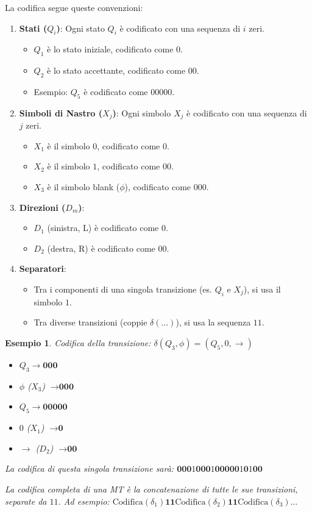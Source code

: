 \documentclass[a4paper, 11pt]{book} %
\newtheorem{example}[theorem]{Esempio}
\theoremstyle{definition}
\begin{document}
La codifica segue queste convenzioni:
\begin{enumerate}
    \item \textbf{Stati ($Q_i$)}: Ogni stato $Q_i$ è codificato con una sequenza di $i$ zeri.
    \begin{itemize}
        \item $Q_1$ è lo stato iniziale, codificato come $0$.
        \item $Q_2$ è lo stato accettante, codificato come $00$.
        \item Esempio: $Q_5$ è codificato come $00000$.
    \end{itemize}
    \item \textbf{Simboli di Nastro ($X_j$)}: Ogni simbolo $X_j$ è codificato con una sequenza di $j$ zeri.
    \begin{itemize}
        \item $X_1$ è il simbolo $0$, codificato come $0$.
        \item $X_2$ è il simbolo $1$, codificato come $00$.
        \item $X_3$ è il simbolo blank ($\phi$), codificato come $000$.
    \end{itemize}
    \item \textbf{Direzioni ($D_m$)}:
    \begin{itemize}
        \item $D_1$ (sinistra, L) è codificato come $0$.
        \item $D_2$ (destra, R) è codificato come $00$.
    \end{itemize}
    \item \textbf{Separatori}:
    \begin{itemize}
        \item Tra i componenti di una singola transizione (es. $Q_i$ e $X_j$), si usa il simbolo $1$.
        \item Tra diverse transizioni (coppie $\delta(\dots)$), si usa la sequenza $11$.
    \end{itemize}
\end{enumerate}

\begin{example}
Codifica della transizione: $\delta(Q_3, \phi) = (Q_5, 0, \rightarrow)$
\begin{itemize}
    \item $Q_3 \rightarrow \textbf{000}$
    \item $\phi$ ($X_3$) $\rightarrow \textbf{000}$
    \item $Q_5 \rightarrow \textbf{00000}$
    \item $0$ ($X_1$) $\rightarrow \textbf{0}$
    \item $\rightarrow$ ($D_2$) $\rightarrow \textbf{00}$
\end{itemize}
La codifica di questa singola transizione sarà:
$\textbf{000} \text{1} \textbf{000} \text{1} \textbf{00000} \text{1} \textbf{0} \text{1} \textbf{00}$

La codifica completa di una MT è la concatenazione di tutte le sue transizioni, separate da $11$. Ad esempio:
$\text{Codifica}(\delta_1) \textbf{11} \text{Codifica}(\delta_2) \textbf{11} \text{Codifica}(\delta_3) \dots$
\end{example}
\end{document}
